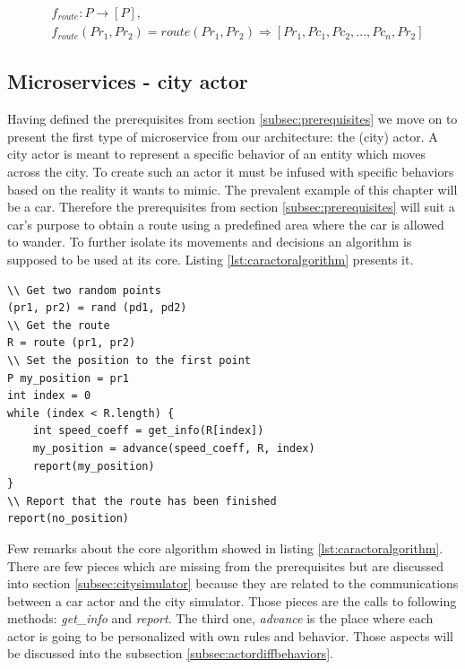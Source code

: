 \documentclass[a4paper,12pt,twoside]{book}
\begin{document}
\begin{equation}
\label{eq:funcroute}
\begin{split}
    & f_{route}: P \rightarrow [P], \\
    & f_{route}(Pr_1, Pr_2) = route (Pr_1, Pr_2) \Rightarrow [Pr_1, Pc_1, Pc_2, ..., Pc_n, Pr_2]
\end{split}
\end{equation}

\subsection{Microservices - city actor}
\label{subsec:cityactor}

Having defined the prerequisites from section \ref{subsec:prerequisites} we move on to present the first type of microservice from our architecture: the (city) actor. A city actor is meant to represent a specific behavior of an entity which moves across the city. To create such an actor it must be infused with specific behaviors based on the reality it wants to mimic. The prevalent example of this chapter will be a car. Therefore the prerequisites from section \ref{subsec:prerequisites} will suit a car's purpose to obtain a route using a predefined area where the car is allowed to wander. To further isolate its movements and decisions an algorithm is supposed to be used at its core. Listing \ref{lst:caractoralgorithm} presents it.

\begin{lstlisting}[caption=Basic algorithm for a car actor, label=lst:caractoralgorithm]
\\ Get two random points
(pr1, pr2) = rand (pd1, pd2)
\\ Get the route
R = route (pr1, pr2)
\\ Set the position to the first point
P my_position = pr1
int index = 0
while (index < R.length) {
    int speed_coeff = get_info(R[index])
    my_position = advance(speed_coeff, R, index)
    report(my_position)
}
\\ Report that the route has been finished
report(no_position)
\end{lstlisting}

Few remarks about the core algorithm showed in listing \ref{lst:caractoralgorithm}. There are few pieces which are missing from the prerequisites but are discussed into section \ref{subsec:citysimulator} because they are related to the communications between a car actor and the city simulator. Those pieces are the calls to following methods: \textit{get\_info} and \textit{report}. The third one, \textit{advance} is the place where each actor is going to be personalized with own rules and behavior. Those aspects will be discussed into the subsection \ref{subsec:actordiffbehaviors}.
\end{document}
